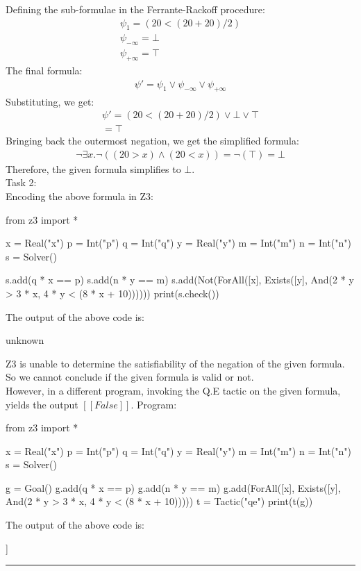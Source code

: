 \documentclass[12pt,letterpaper, onecolumn]{exam}
\begin{document}
\begin{questions}
	Defining the sub-formulae in the Ferrante-Rackoff procedure:
	\begin{align*}
		\psi_1 = (20 < (20 + 20) / 2) \\
		\psi_{-\infty} = \bot \\
		\psi_{+\infty} = \top 
	\end{align*}
	The final formula:
	\begin{align*}
		\psi' = \psi_1 \lor \psi_{-\infty} \lor \psi_{+\infty}
	\end{align*}
	Substituting, we get:
	\begin{align*}
		\psi' = (20 < (20 + 20) / 2) \lor \bot \lor \top \\
		= \top
	\end{align*}
	Bringing back the outermost negation, we get the simplified formula:
	\begin{align*}
		\neg \exists x. \neg ((20 > x) \land (20 < x)) = \neg (\top) = \bot
	\end{align*}
	Therefore, the given formula simplifies to $ \bot $. \\

	Task 2: \\
	Encoding the above formula in Z3:
	\begin{python}
from z3 import *

x = Real("x")
p = Int("p")
q = Int("q")
y = Real("y")
m = Int("m")
n = Int("n")
s = Solver()

s.add(q * x == p)
s.add(n * y == m)
s.add(Not(ForAll([x], Exists([y], And(2 * y > 3 * x, 4 * y < (8 * x + 10))))))
print(s.check())
	\end{python}
	The output of the above code is:
	\begin{python}
unknown
	\end{python}
	Z3 is unable to determine the satisfiability of the negation of the given formula. So we cannot conclude if the given formula is valid or not. \\
	
	However, in a different program, invoking the Q.E tactic on the given formula, yields the output $ [[False]] $. Program: \\
	\begin{python}
from z3 import *

x = Real("x")
p = Int("p")
q = Int("q")
y = Real("y")
m = Int("m")
n = Int("n")
s = Solver()

g = Goal()
g.add(q * x == p)
g.add(n * y == m)
g.add(ForAll([x], Exists([y], And(2 * y > 3 * x, 4 * y < (8 * x + 10)))))
t = Tactic("qe")
print(t(g))
	\end{python}
	The output of the above code is:
	\begin{python}
[[False]]
	\end{python}

    {\rule{17cm}{0.4pt}}

\end{questions}
\end{document}
